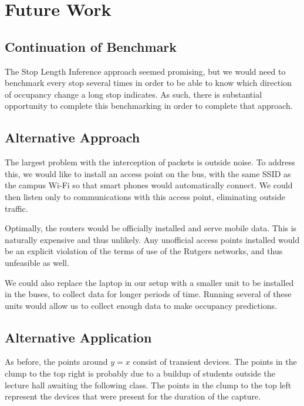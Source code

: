 \section{Future Work}



\subsection*{Continuation of Benchmark}
The Stop Length Inference approach seemed promising, but we would need to benchmark every stop several times in order to be able to know which direction of occupancy change a long stop indicates.
As such, there is substantial opportunity to complete this benchmarking in order to complete that approach.

\subsection*{Alternative Approach}
The largest problem with the interception of packets is outside noise.
To address this, we would like to install an access point on the bus, with the same SSID as the campus Wi-Fi so that smart phones would automatically connect.
We could then listen only to communications with this access point, eliminating outside traffic.
	
Optimally, the routers would be officially installed and serve mobile data.
This is naturally expensive and thus unlikely.
Any unofficial access points installed would be an explicit violation of the terms of use of the Rutgers networks, and thus unfeasible as well.

We could also replace the laptop in our setup with a smaller unit to be installed in the buses, to collect data for longer periods of time.
Running several of these units would allow us to collect enough data to make occupancy predictions.

\subsection*{Alternative Application}


As before, the points around \(y=x\) consist of transient devices.
The points in the clump to the top right is probably due to a buildup of students outside the lecture hall awaiting the following class.
The points in the clump to the top left represent the devices that were present for the duration of the capture.
	
